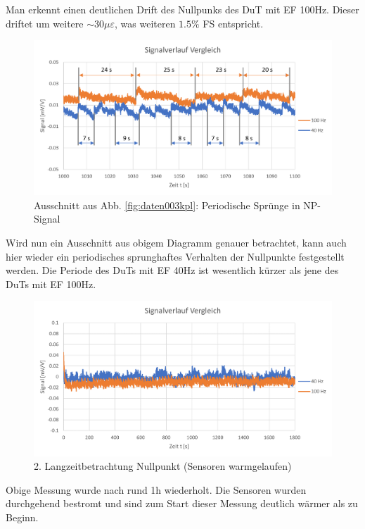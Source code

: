 \documentclass[12pt,a4paper]{article}
\begin{document}
Man erkennt einen deutlichen Drift des Nullpunks des DuT mit EF 100Hz. Dieser driftet um weitere $\sim 30 \mu\varepsilon$, was weiteren $1.5\%$ FS entspricht.
\begin{figure}[H]
	\centering
	\includegraphics[width=1\linewidth]{imgs/daten_003_detail}
	\caption{Ausschnitt aus Abb. \ref{fig:daten003kpl}: Periodische Sprünge in NP-Signal}
	\label{fig:daten003detail}
\end{figure}\noindent
Wird nun ein Ausschnitt aus obigem Diagramm genauer betrachtet, kann auch hier wieder ein periodisches sprunghaftes Verhalten der Nullpunkte festgestellt werden. Die Periode des DuTs mit EF 40Hz ist wesentlich kürzer als jene des DuTs mit EF 100Hz.
\begin{figure}[H]
	\centering
	\includegraphics[width=1\linewidth]{imgs/daten_004_kpl}
	\caption{2. Langzeitbetrachtung Nullpunkt (Sensoren warmgelaufen)}
	\label{fig:daten004kpl}
\end{figure}\noindent
Obige Messung wurde nach rund 1h wiederholt. Die Sensoren wurden durchgehend bestromt und sind zum Start dieser Messung deutlich wärmer als zu Beginn.
\end{document}
